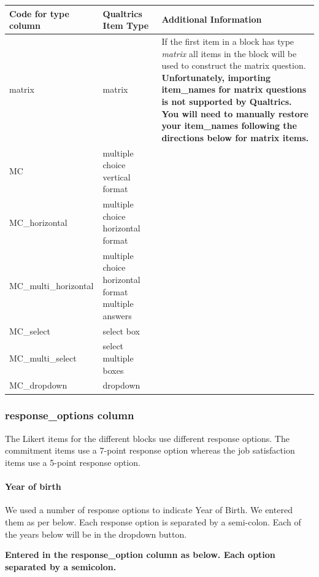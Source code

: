 \documentclass[
]{krantz}
\begin{document}
\begin{longtable}[]{@{}
  >{\raggedright\arraybackslash}p{}
  >{\raggedright\arraybackslash}p{}
  >{\raggedright\arraybackslash}p{}@{}}
\toprule
Code for type column & Qualtrics Item Type & Additional Information \\
\midrule
\endhead
matrix & matrix & If the first item in a block has type \emph{matrix} all items in the block will be used to construct the matrix question. \textbf{Unfortunately, importing item\_names for matrix questions is not supported by Qualtrics. You will need to manually restore your item\_names following the directions below for matrix items.} \\
MC & multiple choice vertical format & \\
MC\_horizontal & multiple choice horizontal format & \\
MC\_multi\_horizontal & multiple choice horizontal format multiple answers & \\
MC\_select & select box & \\
MC\_multi\_select & select multiple boxes & \\
MC\_dropdown & dropdown & \\
\bottomrule
\end{longtable}

\hypertarget{response_options-column}{%
\subsubsection{response\_options column}\label{response_options-column}}

The Likert items for the different blocks use different response options. The commitment items use a 7-point response option whereas the job satisfaction items use a 5-point response option.

\hypertarget{year-of-birth}{%
\paragraph{Year of birth}\label{year-of-birth}}

We used a number of response options to indicate Year of Birth. We entered them as per below. Each response option is separated by a semi-colon. Each of the years below will be in the dropdown button.

\textbf{Entered in the response\_option column as below. Each option separated by a semicolon.}
\end{document}

